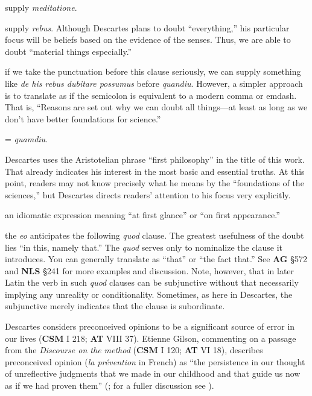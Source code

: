  supply \textit{meditatione}.

 supply \textit{rebus}. Although Descartes plans to doubt ``everything,'' his particular focus will be beliefs based on the evidence of the senses. Thus, we are able to doubt ``material things especially.''

 if we take the punctuation before this clause seriously, we can supply something like \textit{de his rebus dubitare possumus} before \textit{quandiu}. However, a simpler approach is to translate as if the semicolon is equivalent to a modern comma or emdash. That is, ``Reasons are set out why we can doubt all things---at least as long as we don't have better foundations for science.''

 = \textit{quamdiu}.

 Descartes uses the Aristotelian phrase ``first philosophy'' in the title of this work. That already indicates his interest in the most basic and essential truths. At this point, readers may not know precisely what he means by the ``foundations of the sciences,'' but Descartes directs readers' attention to his focus very explicitly.

 an idiomatic expression meaning ``at first glance'' or ``on first appearance.''

 the \textit{eo} anticipates the following \textit{quod} clause. The greatest usefulness of the doubt lies ``in this, namely that.'' The \textit{quod} serves only to nominalize the clause it introduces. You can generally translate as ``that'' or ``the fact that.'' See \textbf{AG} §572 and \textbf{NLS} §241 for more examples and discussion. Note, however, that in later Latin the verb in such \textit{quod} clauses can be subjunctive without that necessarily implying any unreality or conditionality. Sometimes, as here in Descartes, the subjunctive merely indicates that the clause is subordinate.

 Descartes considers preconceived opinions to be a significant source of error in our lives (\textbf{CSM} I 218; \textbf{AT} VIII 37). Etienne Gilson, commenting on a passage from the \textit{Discourse on the method} (\textbf{CSM} I 120; \textbf{AT} VI 18), describes preconceived opinion (\textit{la prévention} in French) as ``the persistence in our thought of unreflective judgments that we made in our childhood and that guide us now as if we had proven them'' (\textcite[199]{gilson2005}; for a fuller discussion see \textcite[199]{gilson1987}).

